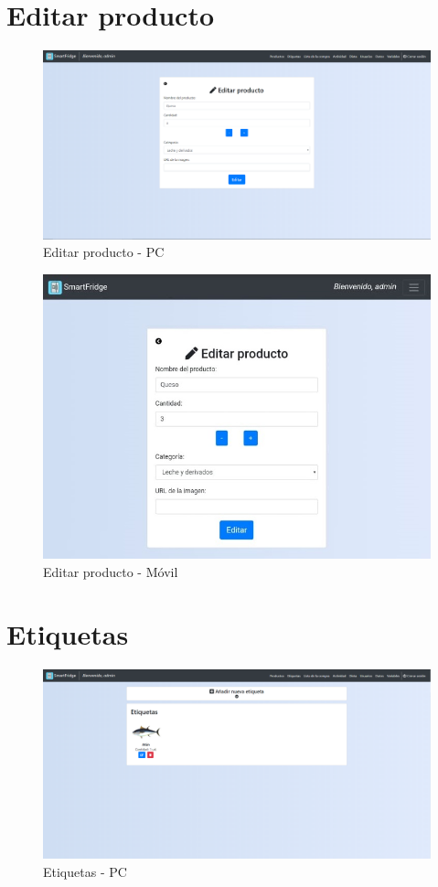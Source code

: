\newpage
\section{Editar producto}
\begin{figure}[h] 
    \centering
    \includegraphics[width=.90\textwidth]{capitulos/anexotres/PC/EditProduct.png}
    \caption{Editar producto - PC}
    \label{fig:editproductpc}
\end{figure}

\begin{figure}[h] 
    \centering
    \includegraphics[width=.50\textwidth]{capitulos/anexotres/Phone/EditProduct.jpeg}
    \caption{Editar producto - Móvil}
    \label{fig:editproductphone}
\end{figure}

\newpage
\section{Etiquetas}
\begin{figure}[h] 
    \centering
    \includegraphics[width=.90\textwidth]{capitulos/anexotres/PC/Labels.png}
    \caption{Etiquetas - PC}
    \label{fig:labelspc}
\end{figure}

